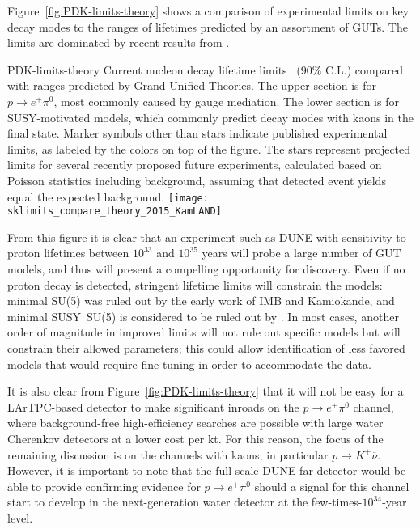 Figure~\ref{fig:PDK-limits-theory} shows a comparison of experimental limits on key decay modes to the
ranges of lifetimes predicted by an assortment of GUTs. The limits are dominated by recent results from \superk.
\begin{cdrfigure}
                 {PDK-limits-theory}
                 {Current nucleon decay lifetime 
                  limits~\cite{Beringer:1900zz,Nishino:2012ipa} (90\% C.L.)
                  compared with ranges predicted by 
                  Grand Unified Theories. The upper section is for
                  $p \rightarrow e^+ \pi^0$, most commonly caused by 
                  gauge mediation.  The lower section is for SUSY-motivated 
                  models, which commonly predict decay modes with kaons 
                  in the final state.  Marker symbols other than stars 
                  indicate published experimental limits, 
                  as labeled by the 
                  colors on top of the figure.  The stars represent projected 
                  limits for several recently proposed future experiments,   
                  calculated based on Poisson statistics including background, 
                  assuming that detected event yields equal the expected 
                  background.}
\texttt{[image: sklimits\_compare\_theory\_2015\_KamLAND]}
\end{cdrfigure}
%
From this figure it is clear that an experiment such as DUNE with sensitivity to proton lifetimes
between $10^{33}$ and $10^{35}$ years will probe a large number of GUT models, and 
thus will present a compelling opportunity for discovery.
Even if no proton decay is detected, stringent lifetime limits will constrain 
the models: minimal SU(5) was ruled out by the early work of IMB and
Kamiokande, and minimal SUSY~SU(5) is considered to be ruled out by \superk.
In most cases, another order of magnitude in improved limits will not rule out
specific models but will constrain their allowed parameters;
this could allow identification of less favored models that %
would require fine-tuning in order to accommodate the data. %

It is also clear from Figure~\ref{fig:PDK-limits-theory} that it will not be easy for 
a LArTPC-based detector to make significant inroads on the $p \rightarrow e^+ \pi^0$ 
channel, where background-free high-efficiency searches are possible with large 
water Cherenkov detectors at a lower cost per kt.  For this reason, the 
focus of the remaining discussion is on the channels with kaons, in particular 
$p \rightarrow K^+ \overline{\nu}$.  However, it is important to note that 
the full-scale DUNE far detector would be able to provide confirming evidence 
for $p \rightarrow e^+ \pi^0$ should a signal for this channel start to develop 
in the next-generation water detector at the few-times-$10^{34}$-year level. 

